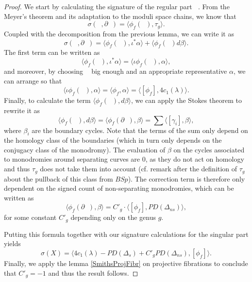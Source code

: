 \documentclass{article}
\DeclareMathOperator{\xreg}{X_{\text{reg.}}}
\DeclareMathOperator{\sreg}{S_{\text{reg.}}}
\theoremstyle{plain}
\theoremstyle{remark}
\theoremstyle{definition}
\begin{document}
\begin{proof}
    We start by calculating the signature of the regular part $\sreg$. From the Meyer's theorem and its adaptation to the moduli space chains, we know that 
    $$\sigma(\xreg, \partial \xreg) = \langle \phi_f(\sreg), \tau_g \rangle.$$
    Coupled with the decomposition from the previous lemma, we can write it as 
    $$\sigma(\xreg, \partial\xreg) = \langle \phi_f(\sreg), \iota^*\alpha\rangle + \langle \phi_f(\sreg) d\beta\rangle.$$
    The first term can be written as 
    $$\langle \phi_f(\sreg), \iota^*\alpha \rangle = \langle \iota \phi_f(\sreg), \alpha\rangle,$$
    and moreover, by choosing $\sreg$ big enough and an appropriate representative $\alpha$, we can arrange so that 
    $$\langle \iota \phi_f(\sreg), \alpha\rangle = \langle \phi_f, \alpha \rangle = \langle [\phi_f] , 4c_1(\lambda)\rangle. $$
    Finally, to calculate the term $\langle \phi_f(\sreg), d\beta\rangle$, we can apply the Stokes theorem to rewrite it as 
    $$\langle \phi_f(\sreg), d\beta\rangle = \langle \phi_f(\partial\sreg), \beta\rangle = \sum \langle[\gamma_i], \beta \rangle,$$
    where $\beta_i$ are the boundary cycles. Note that the terms of the sum only depend on the homology class of the boundaries (which in turn only depends on the conjugacy class of the monodromy). The evaluation of $\beta$ on the cycles associated to monodromies around separating curves are $0$, as they do not act on homology and thus $\tau_g$ does not take them into account (cf. remark after the definition of $\tau_g$ about the pullback of this class from $BSp$). The correction term is therefore only dependent on the signed count of non-separating monodromies, which can be written as 
    $$\langle \phi_f(\partial\sreg), \beta\rangle = C'_g \cdot \langle [\phi_f], PD(\Delta_{ns}) \rangle,$$
    for some constant $C'_g$ depending only on the genus $g$.
    \par 
    Putting this formula together with our signature calculations for the singular part yields 
    $$\sigma(X) = \langle 4c_1(\lambda) - PD(\Delta_s) + C'_g PD(\Delta_{ns}), [\phi_f] \rangle.$$
    Finally, we apply the lemma \ref{SmithsProjFibr} on projective fibrations to conclude that $C'_g = -1$ and thus the result follows.
\end{proof}
\printbibliography
\end{document}
